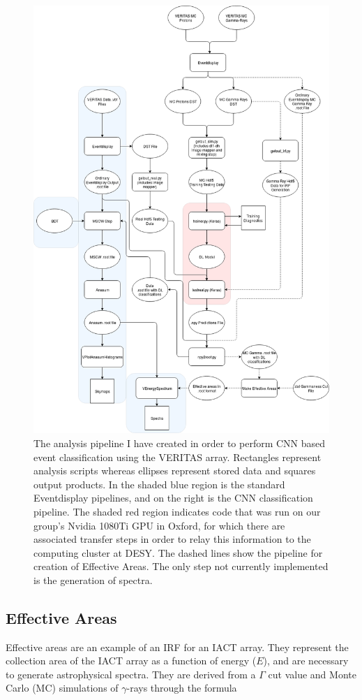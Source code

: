 \begin{figure}[] 
        \centering \includegraphics[width=0.75\columnwidth]{figures/Gettingout.png}

        \caption{
                \label{fig:Gettingout} The analysis pipeline I have created in order to perform CNN based event classification using the VERITAS array. Rectangles represent analysis scripts whereas ellipses represent stored data and squares output products. In the shaded blue region is the standard Eventdisplay pipelines, and on the right is the CNN classification pipeline. The shaded red region indicates code that was run on our group's Nvidia 1080Ti GPU in Oxford, for which there are associated transfer steps in order to relay this information to the computing cluster at DESY. The dashed lines show the pipeline for creation of Effective Areas. The only step not currently implemented is the generation of spectra.
        }
\end{figure}

\subsection{Effective Areas}
Effective areas are an example of an IRF for an IACT array. They represent the collection area of the IACT array as a function of energy ($E$), and are necessary to generate astrophysical spectra. They are derived from a $\Gamma$ cut value and Monte Carlo (MC) simulations of $\gamma$-rays through the formula

